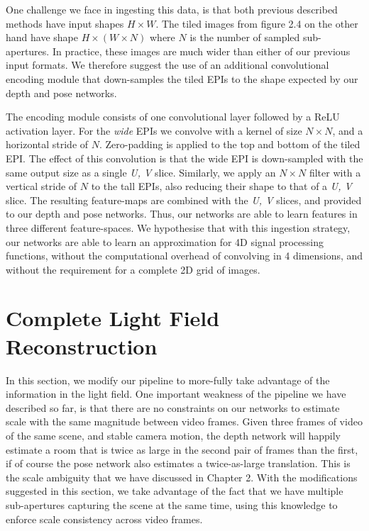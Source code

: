 \newpage

One challenge we face in ingesting this data, is that both previous described methods have input shapes $H \times W$. The tiled images from figure 2.4 on the other hand have shape $H \times (W \times N)$ where $N$ is the number of sampled sub-apertures. In practice, these images are much wider than either of our previous input formats. We therefore suggest the use of an additional convolutional encoding module that down-samples the tiled EPIs to the shape expected by our depth and pose networks.

The encoding module consists of one convolutional layer followed by a ReLU activation layer. For the \textit{wide} EPIs we convolve with a kernel of size $N \times N$, and a horizontal stride of $N$. Zero-padding is applied to the top and bottom of the tiled EPI. The effect of this convolution is that the wide EPI is down-sampled with the same output size as a single \textit{U, V} slice. Similarly, we apply an $N \times N$ filter with a vertical stride of $N$ to the tall EPIs, also reducing their shape to that of a \textit{U, V} slice. The resulting feature-maps are combined with the \textit{U, V} slices, and provided to our depth and pose networks. Thus, our networks are able to learn features in three different feature-spaces. We hypothesise that with this ingestion strategy, our networks are able to learn an approximation for 4D signal processing functions, without the computational overhead of convolving in 4 dimensions, and without the requirement for a complete 2D grid of images.


\section{Complete Light Field Reconstruction}



In this section, we modify our pipeline to more-fully take advantage of the information in the light field. One important weakness of the pipeline we have described so far, is that there are no constraints on our networks to estimate scale with the same magnitude between video frames. Given three frames of video of the same scene, and stable camera motion, the depth network will happily estimate a room that is twice as large in the second pair of frames than the first, if of course the pose network also estimates a twice-as-large translation. This is the scale ambiguity that we have discussed in Chapter 2. With the modifications suggested in this section, we take advantage of the fact that we have multiple sub-apertures capturing the scene at the same time, using this knowledge to enforce scale consistency across video frames. 

